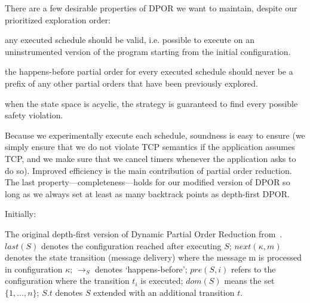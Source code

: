 There are a few desirable properties of DPOR we want to maintain,
despite our prioritized exploration order:

 any executed schedule should be valid, i.e. possible
to execute on an uninstrumented version of the program starting from the
initial configuration.

 the happens-before partial order for every executed schedule
should never be a prefix of any other partial orders that have been
previously explored.

 when the state space is acyclic, the strategy is guaranteed to
find every possible safety violation.

Because we experimentally execute each schedule, soundness is easy to
ensure (we simply ensure that we do not violate TCP semantics if the application
assumes TCP, and we make sure that
we cancel timers whenever the application asks to do so).
Improved efficiency is the main contribution of partial order reduction. The last
property---completeness---holds for our modified version of DPOR so long as we
always set at least as many backtrack points as depth-first
DPOR.

\begin{algorithm*}[tb!]
{\footnotesize
\begin{algorithmic}
\State Initially: 
\Else
{}
\EndIf
\EndIf
\EndFor

\EndWhile
\EndIf

\EndProcedure
\end{algorithmic}
}
\caption{{\label{alg:dpor} The original depth-first version of Dynamic Partial Order Reduction
from~\cite{flanagan2005dynamic}. $last(S)$ denotes the configuration reached
after executing $S$;
$next(\kappa,m)$ denotes the state transition (message delivery) where the message m is
processed in configuration $\kappa$; $\rightarrow_S$ denotes `happens-before';
$pre(S,i)$ refers to the configuration where the transition $t_i$ is executed; $dom(S)$ means the set
$\{1,\dots,n\}$; $S.t$ denotes
$S$ extended with an additional transition $t$.}}
\end{algorithm*}


